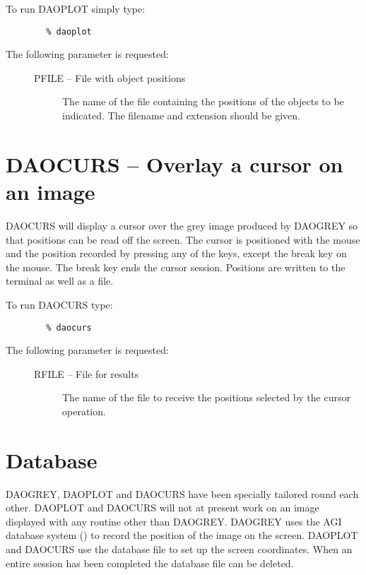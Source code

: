 To run DAOPLOT simply type:

\begin{verbatim}
        % daoplot
\end{verbatim}

The following parameter is requested:

\begin{description}
\item[\mbox{}]\mbox{}
\begin{description}
\item[PFILE -- File with object positions]
The name of the file containing the positions of the objects to be indicated.
The filename and extension should be given.
\end{description}
\end{description}

\section{DAOCURS -- Overlay a cursor on an image}
\label{sec:daocurs}

DAOCURS will display a cursor over the grey image produced by DAOGREY so that
positions can be read off the screen. The cursor is positioned with the mouse and
the position recorded by pressing any of the keys, except the break key on the
mouse. The break key ends the cursor session. Positions are written to the terminal
as well as a file.

To run DAOCURS type:
\begin{verbatim}
        % daocurs
\end{verbatim}

The following parameter is requested:

\begin{description}
\item[\mbox{}]\mbox{}
\begin{description}
\item[RFILE -- File for results]
The name of the file to receive the positions selected by the cursor operation.
\end{description}
\end{description}

\section{Database}
\label{sec:database}

DAOGREY, DAOPLOT and DAOCURS have been specially tailored round each other. DAOPLOT
and DAOCURS will not at present work on an image displayed with any routine other
than DAOGREY. DAOGREY uses the AGI database system () to
record the position of the image on the screen. DAOPLOT and DAOCURS use the
database file to set up the screen coordinates. When an entire session has been
completed the database file can be deleted.






